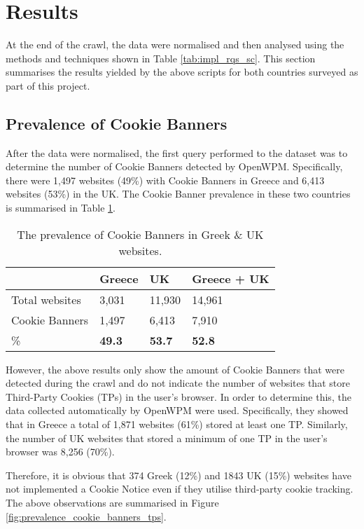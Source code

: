\documentclass[../main.tex]{subfiles}
\begin{document}
\section{Results}
At the end of the crawl, the data were normalised and then analysed using the methods and techniques shown in Table \ref{tab:impl_rqs_sc}. This section summarises the results yielded by the above scripts for both countries surveyed as part of this project.

\subsection{Prevalence of Cookie Banners}
After the data were normalised, the first query performed to the dataset was to determine the number of Cookie Banners detected by OpenWPM. Specifically, there were 1,497 websites (49\%) with Cookie Banners in Greece and 6,413 websites (53\%) in the UK. The Cookie Banner prevalence in these two countries is summarised in Table \ref{tab:res_cookies_prevalence}.

\begin{table}[ht]
    \centering
    \begin{tabular}{@{}llll@{}}
    \toprule
                   & Greece        & UK            & Greece + UK   \\ \midrule
    Total websites & 3,031         & 11,930        & 14,961        \\
    Cookie Banners & 1,497         & 6,413         & 7,910         \\
    \%             & \textbf{49.3} & \textbf{53.7} & \textbf{52.8} \\ \bottomrule
    \end{tabular}
    \caption{The prevalence of Cookie Banners in Greek \& UK websites.}
    \label{tab:res_cookies_prevalence}
\end{table}

However, the above results only show the amount of Cookie Banners that were detected during the crawl and do not indicate the number of websites that store Third-Party Cookies (TPs) in the user’s browser. In order to determine this, the data collected automatically by OpenWPM were used. Specifically, they showed that in Greece a total of 1,871 websites (61\%) stored at least one TP. Similarly, the number of UK websites that stored a minimum of one TP in the user’s browser was 8,256 (70\%).

Therefore, it is obvious that 374 Greek (12\%) and 1843 UK (15\%) websites have not implemented a Cookie Notice even if they utilise third-party cookie tracking. The above observations are summarised in Figure \ref{fig:prevalence_cookie_banners_tps}.
\end{document}

